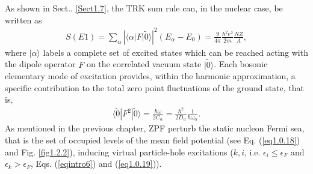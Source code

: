 As shown in Sect.. \ref{Sect1.7}, the TRK sum rule can, in the nuclear case, be written as
\begin{align}\label{eq_intro1}
S(E1)=\sum_\alpha\left|\langle\alpha|F|\tilde 0\rangle\right|^2(E_\alpha-E_0)=\frac{9}{4\pi}\frac{\hbar^2e^2}{2m}\frac{NZ}{A},
\end{align}
where $|\alpha\rangle$ labels a complete set of excited  states which can be reached acting with the dipole operator $F$ on the  correlated vacuum state $|\tilde 0\rangle$. Each bosonic elementary mode of excitation provides, within the harmonic approximation, a specific contribution to the total zero point fluctuations of the ground state, that is,
\begin{align}\label{eqintro2}
\langle\tilde 0|F^2|\tilde 0\rangle=\frac{\hbar \omega}{2C_\alpha}=\frac{\hbar^2}{2D_\alpha}\frac{1}{\hbar\omega_\alpha}.
\end{align}
As mentioned in the previous chapter, ZPF perturb the static nucleon Fermi sea, that is the set of occupied levels of the mean field potential (see Eq. (\ref{eq1.0.18}) and Fig. \ref{fig1.2.2}),
inducing virtual particle-hole excitations ($k,i$, i.e. $\epsilon_i\leq\epsilon_F$ and $\epsilon_k>\epsilon_F$,  Eqs. (\ref{eqintro6}) and (\ref{eq1.0.19})). 
